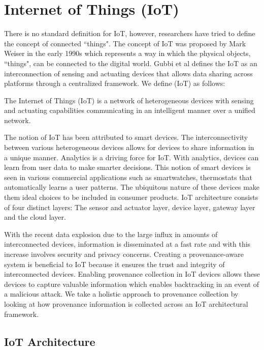  
\section{Internet of Things (IoT)}
There is no standard definition for IoT, however, researchers have tried to define the concept of connected ``things". The concept of IoT was proposed by Mark Weiser in the early 1990s \cite{Mattern} which represents a way in which the physical objects, ``things", can be connected to the digital world. Gubbi et al \cite{park_provenance-based_2012} defines the IoT as  an interconnection of sensing and actuating devices that allows data sharing across platforms through a centralized framework. We define (IoT) as follows:

\begin{definition}
The Internet of Things (IoT) is a network of heterogeneous devices with sensing and actuating capabilities communicating in an intelligent manner over a unified network. 

\end{definition}

The notion of IoT has been attributed to smart devices. The interconnectivity between various heterogeneous devices allows for devices to share information in a unique manner. Analytics is a driving force for IoT. With analytics, devices can learn from user data to make smarter decisions. This notion of smart devices is seen in various commercial applications such as smartwatches, thermostats that automatically learns a user patterns. The ubiquitous nature of these devices make them ideal choices to be included in consumer products. IoT architecture consists of four distinct layers: The sensor and actuator layer, device layer, gateway layer and the cloud layer. 

\par With the recent data explosion \cite{emc_bigdata} due to the large influx in amounts of interconnected devices, information is disseminated at a fast rate and with this increase involves security and privacy concerns. Creating a provenance-aware system is beneficial to IoT because it ensures the trust and  integrity of interconnected devices. Enabling provenance collection in IoT devices allows these devices to capture valuable information which enables backtracking in an event of a malicious attack. We take a holistic approach to provenance collection by looking at how provenance information is collected across an IoT architectural framework.

 
  \subsection{IoT Architecture}

